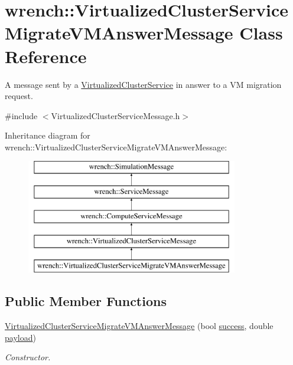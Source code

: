 \hypertarget{classwrench_1_1_virtualized_cluster_service_migrate_v_m_answer_message}{}\section{wrench\+:\+:Virtualized\+Cluster\+Service\+Migrate\+V\+M\+Answer\+Message Class Reference}
\label{classwrench_1_1_virtualized_cluster_service_migrate_v_m_answer_message}


A message sent by a \hyperlink{classwrench_1_1_virtualized_cluster_service}{Virtualized\+Cluster\+Service} in answer to a VM migration request.  




{\ttfamily \#include $<$Virtualized\+Cluster\+Service\+Message.\+h$>$}

Inheritance diagram for wrench\+:\+:Virtualized\+Cluster\+Service\+Migrate\+V\+M\+Answer\+Message\+:\begin{figure}[H]
\begin{center}
\leavevmode
\includegraphics[height=5.000000cm]{classwrench_1_1_virtualized_cluster_service_migrate_v_m_answer_message}
\end{center}
\end{figure}
\subsection*{Public Member Functions}
\begin{DoxyCompactItemize}
\item 
\hyperlink{classwrench_1_1_virtualized_cluster_service_migrate_v_m_answer_message_a8a24158ba2ee9494765dc4008a9f4d83}{Virtualized\+Cluster\+Service\+Migrate\+V\+M\+Answer\+Message} (bool \hyperlink{classwrench_1_1_virtualized_cluster_service_migrate_v_m_answer_message_abaa6fb49d9b039bd46f081613d09661e}{success}, double \hyperlink{classwrench_1_1_simulation_message_a914f2732713f7c02898e66f05a7cb8a1}{payload})
\begin{DoxyCompactList}\small\item\em Constructor. \end{DoxyCompactList}\end{DoxyCompactItemize}
